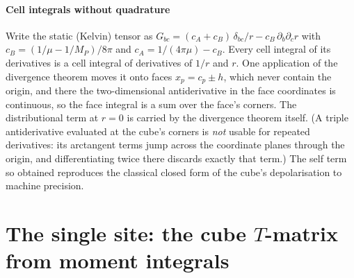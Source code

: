 \documentclass[preprint,review,12pt]{elsarticle}
\providecommand{\texorpdfstring}[2]{#1}
\begin{document}
\paragraph{Cell integrals without quadrature} Write the static (Kelvin) tensor as
$G_{bc}=(c_A+c_B)\,\delta_{bc}/r-c_B\,\partial_b\partial_c r$ with
$c_B=(1/\mu-1/M_P)/8\pi$ and $c_A=1/(4\pi\mu)-c_B$. Every cell integral of its derivatives is a cell
integral of derivatives of $1/r$ and $r$. One application of the divergence theorem moves it onto
faces $x_p=c_p\pm h$, which never contain the origin, and there the two-dimensional antiderivative in
the face coordinates is continuous, so the face integral is a sum over the face's corners. The
distributional term at $r=0$ is carried by the divergence theorem itself. (A triple antiderivative
evaluated at the cube's corners is \emph{not} usable for repeated derivatives: its arctangent terms
jump across the coordinate planes through the origin, and differentiating twice there discards
exactly that term.) The self term so obtained reproduces the classical closed form of the cube's
depolarisation \citep{Chiu1977,Nozaki2001} to machine precision.

\section{The single site: the cube \texorpdfstring{$T$}{T}-matrix from moment integrals}\label{sec:single}
\end{document}
